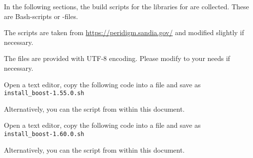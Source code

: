 % 
%               
%          
% 

In the following sections, the build scripts for the libraries for \marktool{\toolname} are collected. These are Bash-scripts or \marktool{\cmakename}-files.

The scripts are taken from \href{https://peridigm.sandia.gov/}{https://peridigm.sandia.gov/} and modified slightly if necessary.

The files are provided with UTF-8 encoding. Please modify to your needs if necessary.

\leveldown{\texorpdfstring{\protect\marktool{\boostname{}}}{\boostname{}}}
\label{sec:Build-script_Boost}


Open a text editor, copy the following code into a file and save as \verb+install_boost-1.55.0.sh+

\begingroup
\lstset{breaklines = true}

\endgroup

\ifpdf
Alternatively, you can  the script from within this document.
\fi


Open a text editor, copy the following code into a file and save as \verb+install_boost-1.60.0.sh+

\begingroup
\lstset{breaklines = true}

\endgroup

\ifpdf
Alternatively, you can  the script from within this document.
\fi

